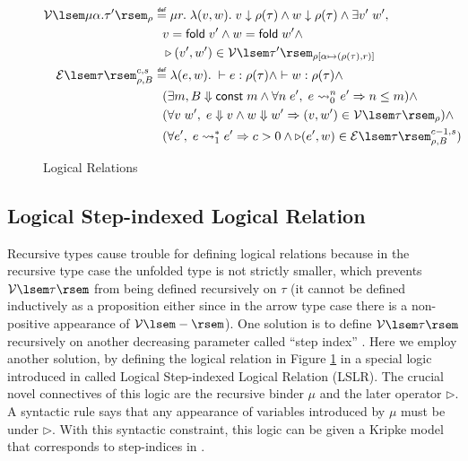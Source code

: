\documentclass[preprint]{sigplanconf}
\newcommand{\symfold}{\mathsf{fold}}
\newcommand{\relV}[1]{\mathcal{V}\lsem#1\rsem}
\newcommand{\relE}[1]{\mathcal{E}\lsem#1\rsem}
\newcommand{\later}{\triangleright}
\newcommand\defeq{\mathrel{\overset{\makebox[0pt]{\mbox{\normalfont\tiny\sffamily def}}}{=}}}
\begin{document}
\begin{figure}
{\begin{align*}
  \relV{\mu\alpha.\tau'}_\rho &\defeq \mu r.\;\lambda (v,w).\; v \downarrow \rho(\tau) \wedge w \downarrow \rho(\tau) \wedge \exists v'\;w',\; \\
  & \hspace{.1in} v = \symfold\; v' \wedge w = \symfold\; w' \wedge \\
  & \hspace{.1in} \later (v',w') \in \relV{\tau'}_{\rho[\alpha\mapsto(\rho(\tau),r)]} \\
  \relE{\tau}^{c,s}_{\rho,B} &\defeq \lambda(e,w).\;\vdash e:\rho(\tau) \wedge \vdash w:\rho(\tau) \wedge \\
  & \hspace{.1in} (\exists m, B \Downarrow \mathsf{const}\;m \wedge \forall n\;e',\; e\leadsto^n_0 e' \Rightarrow n \leq m) \wedge \\
  & \hspace{.1in} (\forall v\;w',\; e\Downarrow v \wedge w\Downarrow w'\Rightarrow (v,w') \in \relV{\tau}_\rho) \wedge \\
  & \hspace{.1in} (\forall e',\; e\leadsto^*_1 e' \Rightarrow c > 0 \wedge \later (e',w)\in \relE{\tau}^{c-1,s}_{\rho,B})
\end{align*}
}
\caption{\label{lrel}Logical Relations}
\end{figure}

\subsection {Logical Step-indexed Logical Relation}
Recursive types cause trouble for defining logical relations because in the recursive type case the unfolded type is not strictly smaller, which prevents $\relV{\tau}$ from being defined recursively on $\tau$ (it cannot be defined inductively as a proposition either since in the arrow type case there is a non-positive appearance of $\relV{-}$). One solution is to define $\relV{\tau}$ recursively on another decreasing parameter called ``step index'' \cite{ahmed2006step}. Here we employ another solution, by defining the logical relation in Figure \ref{lrel} in a special logic introduced in \cite{dreyer2009logical} called Logical Step-indexed Logical Relation (LSLR). The crucial novel connectives of this logic are the recursive binder $\mu$ and the later operator $\later$. A syntactic rule says that any appearance of variables introduced by $\mu$ must be under $\later$. With this syntactic constraint, this logic can be given a Kripke model that corresponds to step-indices in \cite{ahmed2006step}. 
\end{document}
